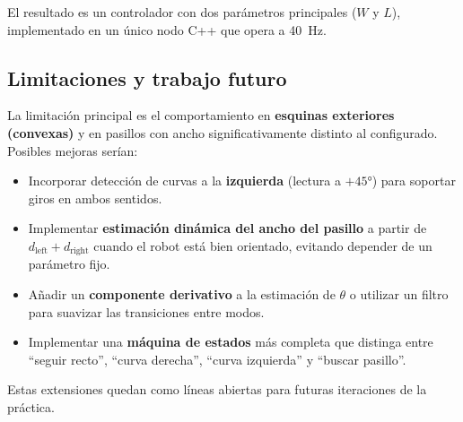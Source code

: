 \documentclass[12pt]{article}
\begin{document}
El resultado es un controlador con dos parámetros principales ($W$ y $L$), implementado en un único nodo C++ que opera a 40~Hz.

\subsection{Limitaciones y trabajo futuro}
La limitación principal es el comportamiento en \textbf{esquinas exteriores (convexas)} y en pasillos con ancho significativamente distinto al configurado. Posibles mejoras serían:

\begin{itemize}[leftmargin=2em]
  \item Incorporar detección de curvas a la \textbf{izquierda} (lectura a $+45°$) para soportar giros en ambos sentidos.
  \item Implementar \textbf{estimación dinámica del ancho del pasillo} a partir de $d_\text{left} + d_\text{right}$ cuando el robot está bien orientado, evitando depender de un parámetro fijo.
  \item Añadir un \textbf{componente derivativo} a la estimación de $\theta$ o utilizar un filtro para suavizar las transiciones entre modos.
  \item Implementar una \textbf{máquina de estados} más completa que distinga entre ``seguir recto'', ``curva derecha'', ``curva izquierda'' y ``buscar pasillo''.
\end{itemize}

Estas extensiones quedan como líneas abiertas para futuras iteraciones de la práctica.
\end{document}
